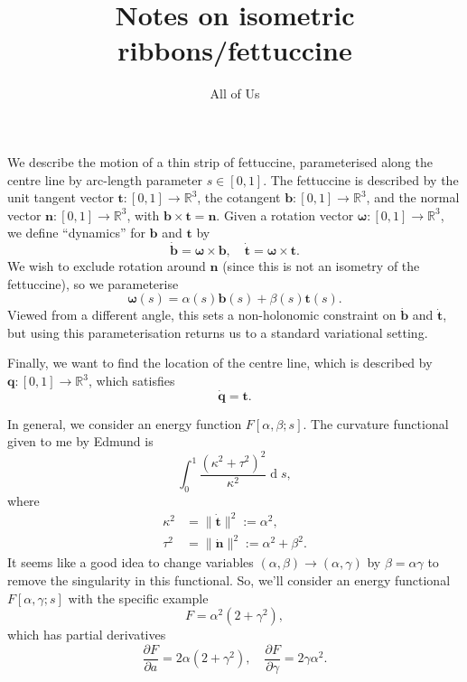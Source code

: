 \documentclass{article}
\def\MM#1{\boldsymbol{#1}}
\newcommand{\pp}[2]{\frac{\partial #1}{\partial #2}}
\def\MM#1{\boldsymbol{#1}}
\DeclareMathOperator{\diff}{d}
\begin{document}
\title{Notes on isometric ribbons/fettuccine}
\author{All of Us}
\maketitle

We describe the motion of a thin strip of fettuccine, parameterised
along the centre line by arc-length parameter $s\in [0,1]$.  The
fettuccine is described by the unit tangent vector $\MM{t}:[0,1]\to
\mathbb{R}^3$, the cotangent $\MM{b}:[0,1]\to \mathbb{R}^3$, and the
normal vector $\MM{n}:[0,1]\to \mathbb{R}^3$, with
$\MM{b}\times\MM{t}=\MM{n}$. Given a rotation vector
$\MM{\omega}:[0,1]\to \mathbb{R}^3$, we define ``dynamics'' for
$\MM{b}$ and $\MM{t}$ by
\begin{equation}
  \dot{\MM{b}} = \MM{\omega}\times\MM{b}, \quad
  \dot{\MM{t}} = \MM{\omega}\times\MM{t}.
\end{equation}
We wish to exclude rotation around $\MM{n}$ (since this is not an
isometry of the fettuccine), so we parameterise
\begin{equation}
  \MM{\omega}(s) = \alpha(s)\MM{b}(s) + \beta(s)\MM{t}(s).
\end{equation}
Viewed from a different angle, this sets a non-holonomic constraint on
$\dot{\MM{b}}$ and $\dot{\MM{t}}$, but using this parameterisation
returns us to a standard variational setting.

Finally, we want to find the location of the centre line, which is
described by $\MM{q}:[0,1]\to \mathbb{R}^3$, which satisfies
\begin{equation}
  \dot{\MM{q}} = \MM{t}.
\end{equation}

In general, we consider an energy function
$F[\alpha,\beta;s]$. The curvature functional given to me by Edmund is
\begin{equation}
  \int_0^1 \frac{(\kappa^2 + \tau^2)^2}{\kappa^2}\diff s,
\end{equation}
where
\begin{align}
  \kappa^2 & = \|\dot{\MM{t}}\|^2 := \alpha^2, \\
  \tau^2 & = \|\dot{\MM{n}}\|^2 := \alpha^2 + \beta^2.
\end{align}
It seems like a good idea to change variables $(\alpha,\beta)\to
(\alpha,\gamma)$ by $\beta=\alpha\gamma$
to remove the singularity in this functional. So, we'll consider
an energy functional $F[\alpha,\gamma;s]$ with the specific example
\begin{equation}
  F = \alpha^2(2+\gamma^2),
\end{equation}
which has partial derivatives
\begin{equation}
  \pp{F}{a} = 2\alpha(2+\gamma^2), \quad \pp{F}{\gamma} = 2\gamma\alpha^2.
\end{equation}
\end{document}

